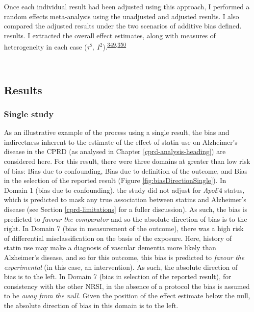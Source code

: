 \documentclass[a4paper, twoside]{templates/ociamthesis}
\begin{document}
Once each individual result had been adjusted using this approach, I performed a random effects meta-analysis using the unadjusted and adjusted results. I also compared the adjusted results under the two scenarios of additive bias defined. results. I extracted the overall effect estimates, along with measures of heterogeneity in each case (\(\tau^2\), \(I^2\)).\textsuperscript{\protect\hyperlink{ref-higgins2003}{349},\protect\hyperlink{ref-higgins2008}{350}}

~

\hypertarget{quant-tri-results}{%
\subsection{Results}\label{quant-tri-results}}

\hypertarget{single-study}{%
\subsubsection{Single study}\label{single-study}}

As an illustrative example of the process using a single result, the bias and indirectness inherent to the estimate of the effect of statin use on Alzheimer's disease in the CPRD (as analysed in Chapter \ref{cprd-analysis-heading}) are considered here. For this result, there were three domains at greater than low risk of bias: Bias due to confounding, Bias due to definition of the outcome, and Bias in the selection of the reported result (Figure \ref{fig:biasDirectionSingle}). In Domain 1 (bias due to confounding), the study did not adjust for \emph{Apo}\(\mathcal{E}4\) status, which is predicted to mask any true association between statins and Alzheimer's disease (see Section \ref{cprd-limitations} for a fuller discussion). As such, the bias is predicted to \emph{favour the comparator} and so the absolute direction of bias is to the right. In Domain 7 (bias in measurement of the outcome), there was a high risk of differential misclassification on the basis of the exposure. Here, history of statin use may make a diagnosis of vascular dementia more likely than Alzheimer's disease, and so for this outcome, this bias is predicted to \emph{favour the experimental} (in this case, an intervention). As such, the absolute direction of bias is to the left. In Domain 7 (bias in selection of the reported result), for consistency with the other NRSI, in the absence of a protocol the bias is assumed to be \emph{away from the null}. Given the position of the effect estimate below the null, the absolute direction of bias in this domain is to the left.
\end{document}
